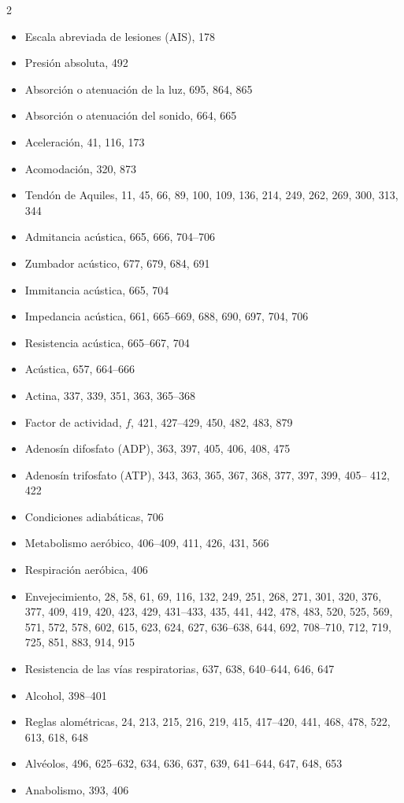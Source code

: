 \documentclass[12pt,a4paper]{book}
\begin{document}
\begin{multicols}{2}
\begin{itemize}[leftmargin=*]
  \item Escala abreviada de lesiones (AIS), 178
  \item Presión absoluta, 492
  \item Absorción o atenuación de la luz, 695, 864, 865
  \item Absorción o atenuación del sonido, 664, 665
  \item Aceleración, 41, 116, 173
  \item Acomodación, 320, 873
  \item Tendón de Aquiles, 11, 45, 66, 89, 100, 109, 136, 214, 249, 262, 269, 300, 313, 344
  \item Admitancia acústica, 665, 666, 704--706
  \item Zumbador acústico, 677, 679, 684, 691
  \item Immitancia acústica, 665, 704
  \item Impedancia acústica, 661, 665--669, 688, 690, 697, 704, 706
  \item Resistencia acústica, 665--667, 704
  \item Acústica, 657, 664--666
  \item Actina, 337, 339, 351, 363, 365--368
  \item Factor de actividad, $f$, 421, 427--429, 450, 482, 483, 879
  \item Adenosín difosfato (ADP), 363, 397, 405, 406, 408, 475
  \item Adenosín trifosfato (ATP), 343, 363, 365, 367, 368, 377, 397, 399, 405-- 412, 422
  \item Condiciones adiabáticas, 706
  \item Metabolismo aeróbico, 406--409, 411, 426, 431, 566
  \item Respiración aeróbica, 406
  \item Envejecimiento, 28, 58, 61, 69, 116, 132, 249, 251, 268, 271, 301, 320, 376, 377, 409, 419, 420, 423, 429, 431--433, 435, 441, 442, 478, 483, 520, 525, 569, 571, 572, 578, 602, 615, 623, 624, 627, 636--638, 644, 692, 708--710, 712, 719, 725, 851, 883, 914, 915
  \item Resistencia de las vías respiratorias, 637, 638, 640--644, 646, 647
  \item Alcohol, 398--401
  \item Reglas alométricas, 24, 213, 215, 216, 219, 415, 417--420, 441, 468, 478, 522, 613, 618, 648
  \item Alvéolos, 496, 625--632, 634, 636, 637, 639, 641--644, 647, 648, 653
  \item Anabolismo, 393, 406

\end{itemize}
\end{multicols}
\end{document}
